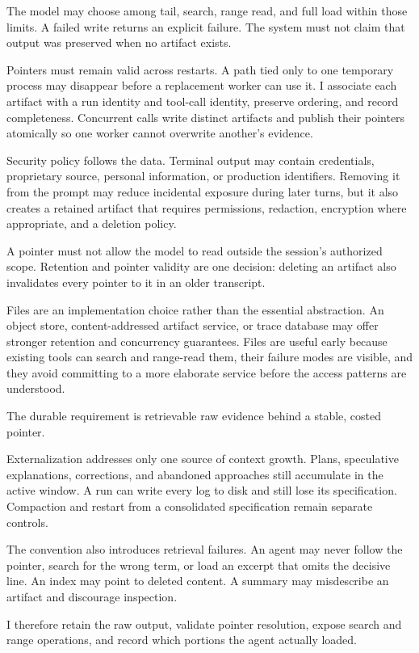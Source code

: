 The model may choose among tail, search, range read, and full load within those limits. A failed write returns an explicit failure. The system must not claim that output was preserved when no artifact exists.

Pointers must remain valid across restarts. A path tied only to one temporary process may disappear before a replacement worker can use it. I associate each artifact with a run identity and tool-call identity, preserve ordering, and record completeness. Concurrent calls write distinct artifacts and publish their pointers atomically so one worker cannot overwrite another's evidence.

Security policy follows the data. Terminal output may contain credentials, proprietary source, personal information, or production identifiers. Removing it from the prompt may reduce incidental exposure during later turns, but it also creates a retained artifact that requires permissions, redaction, encryption where appropriate, and a deletion policy.

A pointer must not allow the model to read outside the session's authorized scope. Retention and pointer validity are one decision: deleting an artifact also invalidates every pointer to it in an older transcript.

Files are an implementation choice rather than the essential abstraction. An object store, content-addressed artifact service, or trace database may offer stronger retention and concurrency guarantees. Files are useful early because existing tools can search and range-read them, their failure modes are visible, and they avoid committing to a more elaborate service before the access patterns are understood.

The durable requirement is retrievable raw evidence behind a stable, costed pointer.

Externalization addresses only one source of context growth. Plans, speculative explanations, corrections, and abandoned approaches still accumulate in the active window. A run can write every log to disk and still lose its specification. Compaction and restart from a consolidated specification remain separate controls.

The convention also introduces retrieval failures. An agent may never follow the pointer, search for the wrong term, or load an excerpt that omits the decisive line. An index may point to deleted content. A summary may misdescribe an artifact and discourage inspection.

I therefore retain the raw output, validate pointer resolution, expose search and range operations, and record which portions the agent actually loaded.

